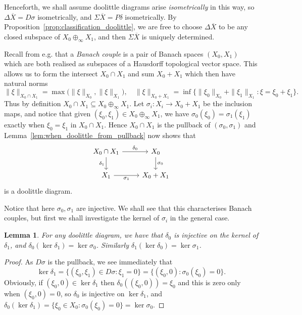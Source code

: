 \documentclass[a4paper,11pt]{article}
\theoremstyle{plain}
\newtheorem{lemma}[proposition]{Lemma}
\theoremstyle{remark}
\begin{document}
Henceforth, we shall assume doolittle diagrams arise \emph{isometrically} in this way, so $\Delta\overline X = D\sigma$ isometrically, and $\Sigma\overline X = P\delta$ isometrically.  By Proposition~\ref{prop:classification_doolittle}, we are free to choose $\Delta\overline X$ to be any closed subspace of $X_0\oplus_\infty X_1$, and then $\Sigma\overline X$ is uniquely determined.

Recall from e.g. \cite{BL_Interpolation_Sps_Book} that a \emph{Banach couple} is a pair of Banach spaces $(X_0, X_1)$ which are both realised as subspaces of a Hausdorff topological vector space.  This allows us to form the intersect $X_0 \cap X_1$ and sum $X_0 + X_1$ which then have natural norms
\[ \|\xi\|_{X_0 \cap X_1} = \max\big( \|\xi\|_{X_0}, \|\xi\|_{X_1} \big), \quad
\|\xi\|_{X_0+X_1} = \inf\{ \|\xi_0\|_{X_0} + \|\xi_1\|_{X_1} : \xi = \xi_0+\xi_1 \}. \]
Thus by definition $X_0 \cap X_1 \subseteq X_0 \oplus_\infty X_1$.  Let $\sigma_i \colon X_i \to X_0 + X_1$ be the inclusion maps, and notice that given $(\xi_0,\xi_1) \in X_0 \oplus_\infty X_1$, we have $\sigma_0(\xi_0) = \sigma_1(\xi_1)$ exactly when $\xi_0 = \xi_1$ in $X_0 \cap X_1$.  Hence $X_0 \cap X_1$ is the pullback of $(\sigma_0, \sigma_1)$ and Lemma~\ref{lem:when_doolittle_from_pullback} now shows that
\[ \begin{tikzcd}
X_0 \cap X_1 \arrow[r, "\delta_0"] \arrow[d, "\delta_1"'] & X_0 \arrow[d, "\sigma_0"] \\
X_1 \arrow[r, "\sigma_1"'] & X_0+X_1
\end{tikzcd} \]
is a doolittle diagram.

Notice that here $\sigma_0, \sigma_1$ are injective.  We shall see that this characterises Banach couples, but first we shall investigate the kernel of $\sigma_i$ in the general case.

\begin{lemma}\label{lem:kernels_maps}
For any doolittle diagram, we have that $\delta_0$ is injective on the kernel of $\delta_1$, and $\delta_0(\ker \delta_1) = \ker \sigma_0$.  Similarly $\delta_1(\ker \delta_0) = \ker \sigma_1$.
\end{lemma}
\begin{proof}
As $D\sigma$ is the pullback, we see immediately that
\[ \ker\delta_1 = \{ (\xi_0,\xi_1) \in D\sigma : \xi_1 = 0 \}
= \{ (\xi_0, 0) : \sigma_0(\xi_0) = 0 \}. \]
Obviously, if $(\xi_0,0) \in \ker\delta_1$ then $\delta_0((\xi_0,0)) = \xi_0$ and this is zero only when $(\xi_0,0) = 0$, so $\delta_0$ is injective on $\ker\delta_1$, and $\delta_0(\ker\delta_1) = \{ \xi_0\in X_0 : \sigma_0(\xi_0)=0 \} = \ker\sigma_0$.
\end{proof}
\end{document}
